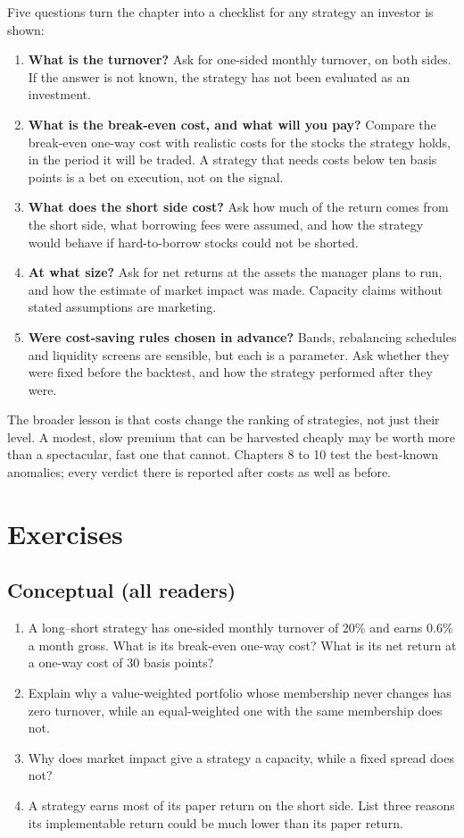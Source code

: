 Five questions turn the chapter into a checklist for any strategy an investor is shown:

\begin{enumerate}
  \item \textbf{What is the turnover?} Ask for one-sided monthly turnover, on both sides. If the answer is not known, the strategy has not been evaluated as an investment.
  \item \textbf{What is the break-even cost, and what will you pay?} Compare the break-even one-way cost with realistic costs for the stocks the strategy holds, in the period it will be traded. A strategy that needs costs below ten basis points is a bet on execution, not on the signal.
  \item \textbf{What does the short side cost?} Ask how much of the return comes from the short side, what borrowing fees were assumed, and how the strategy would behave if hard-to-borrow stocks could not be shorted.
  \item \textbf{At what size?} Ask for net returns at the assets the manager plans to run, and how the estimate of market impact was made. Capacity claims without stated assumptions are marketing.
  \item \textbf{Were cost-saving rules chosen in advance?} Bands, rebalancing schedules and liquidity screens are sensible, but each is a parameter. Ask whether they were fixed before the backtest, and how the strategy performed after they were.
\end{enumerate}

The broader lesson is that costs change the ranking of strategies, not just their level. A modest, slow premium that can be harvested cheaply may be worth more than a spectacular, fast one that cannot. Chapters 8 to 10 test the best-known anomalies; every verdict there is reported after costs as well as before.

\section*{Exercises}

\subsection*{Conceptual (all readers)}

\begin{enumerate}
  \item A long--short strategy has one-sided monthly turnover of 20\% and earns 0.6\% a month gross. What is its break-even one-way cost? What is its net return at a one-way cost of 30 basis points?
  \item Explain why a value-weighted portfolio whose membership never changes has zero turnover, while an equal-weighted one with the same membership does not.
  \item Why does market impact give a strategy a capacity, while a fixed spread does not?
  \item A strategy earns most of its paper return on the short side. List three reasons its implementable return could be much lower than its paper return.
\end{enumerate}

